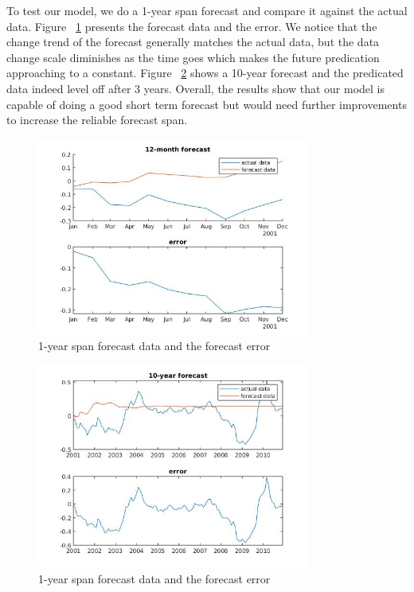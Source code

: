 \documentclass{article}
\begin{document}
To test our model, we do a 1-year span forecast and compare it against the actual data. Figure ~\ref{fig:forecast1} presents the forecast data and the error. We notice that the change trend of the forecast generally matches the actual data, but the data change scale diminishes as the time goes which makes the future predication approaching to a constant. Figure ~\ref{fig:forecast10} shows a 10-year forecast and the predicated data indeed level off after 3 years. Overall, the results show that our model is capable of doing a good short term forecast but would need further improvements to increase the reliable forecast span.

\begin{figure}[h!]
    \centering
        \includegraphics[width=0.8\textwidth]{forecast-1-year.jpg}
    \caption{1-year span forecast data and the forecast error}
    \label{fig:forecast1}
\end{figure}

\begin{figure}[h!]
    \centering
        \includegraphics[width=0.8\textwidth]{forecast-10-year.jpg}
    \caption{1-year span forecast data and the forecast error}
    \label{fig:forecast10}
\end{figure}
 

\end{document}
